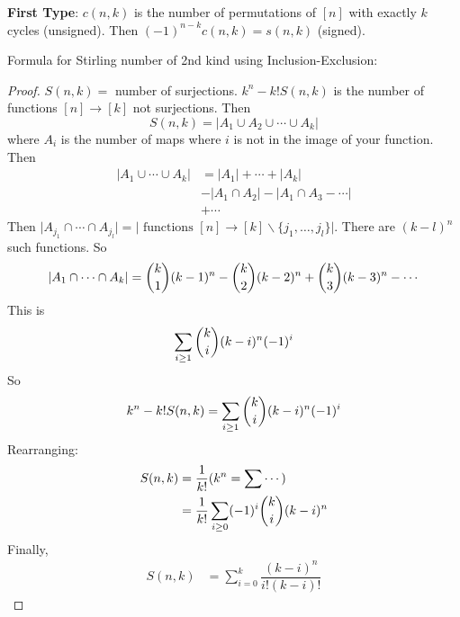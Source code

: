 \documentclass{report}
\begin{document}
\textbf{First Type}: $c(n, k)$ is the number of permutations of $[n]$ with exactly $k$ cycles (unsigned). Then $(-1)^{n -k}c(n, k) = s(n, k)$ (signed). 

Formula for Stirling number of 2nd kind using Inclusion-Exclusion: 
    \begin{proof}
        $S(n, k) = $ number of surjections. $k^{n} - k!S(n, k)$ is the number of functions $[n] \rightarrow[k]$ not surjections. Then
            \begin{equation*}
                S(n, k) = \lvert A_{1} \cup A_{2} \cup \cdots \cup A_{k} \rvert
            \end{equation*}
        where $A_{i}$ is the number of maps where $i$ is not in the image of your function. Then
            \begin{align*}
                \lvert A_{1} \cup \cdots \cup   A_{k} \rvert &= \lvert A_{1} \rvert + \cdots + \lvert A_{k} \rvert                       \\
                                                             &- \lvert A_{1} \cap A_{2} \rvert - \lvert A_{1} \cap A_{3} - \cdots  \rvert \\
                                                             &+  \cdots                                                                    
            \end{align*}
        Then $\lvert A_{j_{1}} \cap \cdots \cap A_{j_{l}} \rvert = \lvert  \text{ functions $[n] \rightarrow [k] \backslash \{j_{1}, \ldots, j_{l}\}$} \rvert$. There are $(k - l)^{n}$ such functions. So
            \begin{equation*}
                \lvert A_{1} \cap \cdots \cap A_{k} \rvert = \dbinom{k}{1}(k - 1)^{n} - \dbinom{k}{2}(k - 2)^{n} + \dbinom{k}{3} (k - 3)^{n} - \cdots
            \end{equation*}
        This is
            \begin{equation*}
                \sum_{i \geq 1} \dbinom{k}{i}(k  -i)^{n}(-1)^{i}
            \end{equation*}
        So
            \begin{equation*}
                k^{n} - k!S(n, k) = \sum_{i \geq 1} \dbinom{k}{i}(k - i)^{n}(-1)^{i}
            \end{equation*}
        Rearranging:
            \begin{align*}
                S(n, k) &= \dfrac{1}{k!}(k^{n} = \sum \cdots) \\
                        &= \dfrac{1}{k!}\sum_{i \geq0} (-1)^{i}\dbinom{k}{i}(k - i)^{n}          
            \end{align*}
        Finally,
            \begin{align*}
                S(n, k) &= \sum_{i = 0}^{k}\dfrac{(k - i)^{n}}{i!(k - i)!}   
            \end{align*}
    \end{proof}
\end{document}

